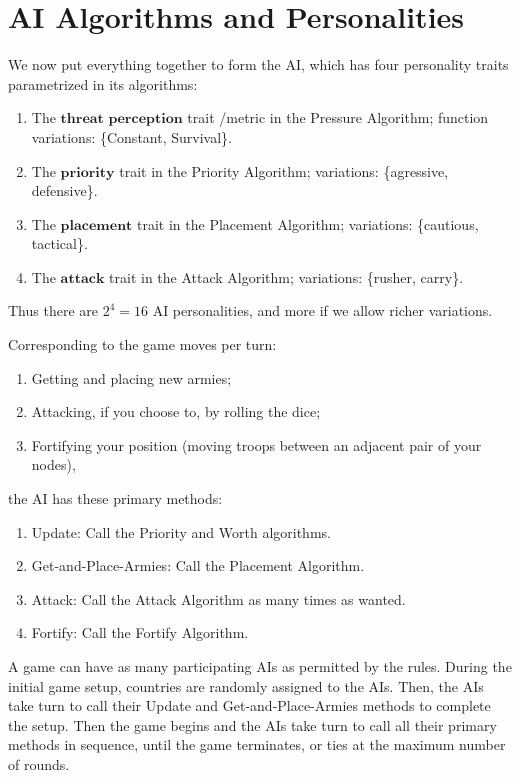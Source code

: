 \documentclass[12pt]{article}  %
\begin{document}
\section{AI Algorithms and Personalities}

We now put everything together to form the AI, which has four personality traits parametrized in its algorithms: 

\begin{enumerate}
	\item The $\textbf{threat perception}$ trait /metric in the Pressure Algorithm; function variations: \{Constant, Survival\}.
	\item The $\textbf{priority}$ trait in the Priority Algorithm; variations: \{agressive, defensive\}.
	\item The $\textbf{placement}$ trait in the Placement Algorithm; variations: \{cautious, tactical\}.
	\item The $\textbf{attack}$ trait in the Attack Algorithm; variations: \{rusher, carry\}.
\end{enumerate}

Thus there are $2^4 = 16$ AI personalities, and more if we allow richer variations.


Corresponding to the game moves per turn:
\begin{enumerate}
\item Getting and placing new armies;
\item Attacking, if you choose to, by rolling the dice; 
\item Fortifying your position (moving troops between an adjacent pair of your nodes),
\end{enumerate}

the AI has these primary methods:
\begin{enumerate}
\item Update: Call the Priority and Worth algorithms.
\item Get-and-Place-Armies: Call the Placement Algorithm.
\item Attack: Call the Attack Algorithm as many times as wanted.
\item Fortify: Call the Fortify Algorithm.
\end{enumerate}



A game can have as many participating AIs as permitted by the rules. During the initial game setup, countries are randomly assigned to the AIs. Then, the AIs take turn to call their Update and Get-and-Place-Armies methods to complete the setup. Then the game begins and the AIs take turn to call all their primary methods in sequence, until the game terminates, or ties at the maximum number of rounds.
\end{document}
